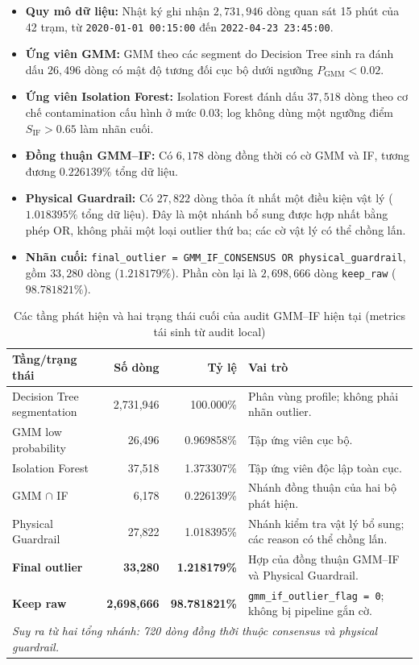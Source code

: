 \documentclass[12pt,a4paper]{article}
\begin{document}
\begin{itemize}
    \item \textbf{Quy mô dữ liệu:} Nhật ký ghi nhận $2{,}731{,}946$ dòng quan sát 15 phút của 42 trạm, từ \texttt{2020-01-01 00:15:00} đến \texttt{2022-04-23 23:45:00}.
    \item \textbf{Ứng viên GMM:} GMM theo các segment do Decision Tree sinh ra đánh dấu $26{,}496$ dòng có mật độ tương đối cục bộ dưới ngưỡng $P_{\text{GMM}} < 0.02$.
    \item \textbf{Ứng viên Isolation Forest:} Isolation Forest đánh dấu $37{,}518$ dòng theo cơ chế contamination cấu hình ở mức $0.03$; log không dùng một ngưỡng điểm $S_{\text{IF}} > 0.65$ làm nhãn cuối.
    \item \textbf{Đồng thuận GMM--IF:} Có $6{,}178$ dòng đồng thời có cờ GMM và IF, tương đương $0.226139\%$ tổng dữ liệu.
    \item \textbf{Physical Guardrail:} Có $27{,}822$ dòng thỏa ít nhất một điều kiện vật lý ($1.018395\%$ tổng dữ liệu). Đây là một nhánh bổ sung được hợp nhất bằng phép OR, không phải một loại outlier thứ ba; các cờ vật lý có thể chồng lấn.
    \item \textbf{Nhãn cuối:} \texttt{final\_outlier = GMM\_IF\_CONSENSUS OR physical\_guardrail}, gồm $33{,}280$ dòng ($1.218179\%$). Phần còn lại là $2{,}698{,}666$ dòng \texttt{keep\_raw} ($98.781821\%$).
\end{itemize}

\begin{table}[htbp]
\centering
\caption{Các tầng phát hiện và hai trạng thái cuối của audit GMM--IF hiện tại (metrics tái sinh từ audit local)}
\label{tab:gmm_if_log_results}
\small
\begin{tabularx}{\linewidth}{l r r X}
\toprule
\textbf{Tầng/trạng thái} & \textbf{Số dòng} & \textbf{Tỷ lệ} & \textbf{Vai trò} \\
\midrule
Decision Tree segmentation & 2,731,946 & 100.000\% & Phân vùng profile; không phải nhãn outlier. \\
GMM low probability & 26,496 & 0.969858\% & Tập ứng viên cục bộ. \\
Isolation Forest & 37,518 & 1.373307\% & Tập ứng viên độc lập toàn cục. \\
GMM $\cap$ IF & 6,178 & 0.226139\% & Nhánh đồng thuận của hai bộ phát hiện. \\
Physical Guardrail & 27,822 & 1.018395\% & Nhánh kiểm tra vật lý bổ sung; các reason có thể chồng lấn. \\
\textbf{Final outlier} & \textbf{33,280} & \textbf{1.218179\%} & Hợp của đồng thuận GMM--IF và Physical Guardrail. \\
\textbf{Keep raw} & \textbf{2,698,666} & \textbf{98.781821\%} & \texttt{gmm\_if\_outlier\_flag = 0}; không bị pipeline gắn cờ. \\
\midrule
\multicolumn{4}{l}{\textit{Suy ra từ hai tổng nhánh: 720 dòng đồng thời thuộc consensus và physical guardrail.}} \\
\bottomrule
\end{tabularx}
\end{table}
\end{document}

